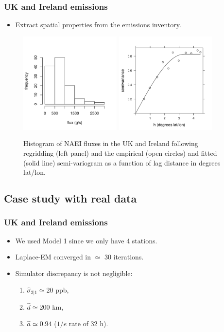\documentclass{beamer}
\begin{document}
\begin{frame}
\frametitle{UK and Ireland emissions}
\begin{itemize}
\item Extract spatial properties from the emissions inventory.
\end{itemize}
\begin{center}
\vspace{-0.5cm}

\begin{figure}
\includegraphics[width=2.0in]{histUK.png}  
\includegraphics[width=2.0in]{variogram_est.png}  
	\caption{Histogram of NAEI fluxes in the UK and Ireland following regridding (left panel) and the empirical (open circles) and fitted (solid line) semi-variogram as a function of lag distance in degrees lat/lon. } \label{fig:var_est}
\end{figure}
\end{center}
\end{frame}

\subsection{Case study with real data}

\begin{frame}
\frametitle{UK and Ireland emissions}
\begin{itemize}
\item We used Model 1 since we only have 4 stations. \vfill
\item Laplace-EM converged in $\simeq$ 30 iterations. \vfill
\item Simulator discrepancy is not negligible: \vfill
\begin{enumerate}
\item $\hat\sigma_{2|1} \simeq 20$ ppb, \vfill
\item $\hat d \simeq 200$ km, \vfill
\item $\hat a \simeq 0.94$ ($1/e$ rate of 32 h). \vfill
\end{enumerate}
\end{itemize}
\end{frame}
\end{document}
